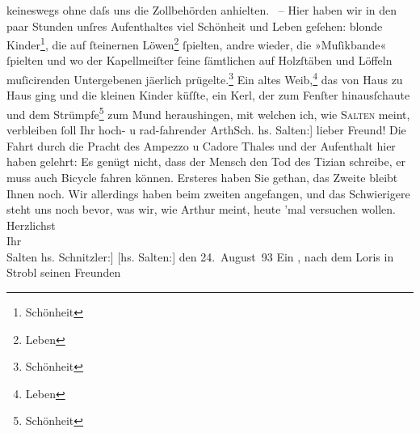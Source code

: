 \begin{ledgroupsized}[t]{13cm}
               keineswegs ohne daſs uns die Zollbehörden anhielten.  – Hier haben wir in den paar
               Stunden unſres Aufenthaltes viel Schönheit und Leben geſehen: blonde Kinder\footnote{\noindent{}Schönheit}, die auf ſteinernen Löwen\footnote{\noindent{}Leben}{ }ſpielten, andre wieder, die »Muſikbande« ſpielten
               und wo der Kapellmeiſter ſeine ſämtlichen auf {\pb}Holzſtäben
               und Löffeln muſicirenden Untergebenen jä{\geminationm}erlich
                  prügelte.\footnote{\noindent{}Schönheit} Ein altes Weib,\footnote{\noindent{}Leben} das von Haus zu Haus ging und die kleinen Kinder küſſte, ein Kerl, der
               zum Fenſter hinausſchaute und dem Strümpfe\footnote{\noindent{}Schönheit} zum Mund heraushingen, mit welchen ich, wie \textsc{Salten} meint, verbleiben ſoll\pend
           \pstart Ihr hoch- u rad-fahrender \spacefill\mbox{ArthSch.}\pend{}\pstart
           \noindent{}{\pb}{[}hs. Salten:{]} lieber Freund! Die Fahrt durch die Pracht des Ampezzo u Cadore Thales und
               der Aufenthalt hier haben gelehrt: Es genügt nicht, dass der Mensch den Tod des Tizian schreibe, er muss auch Bicycle fahren
               können. Ersteres haben Sie gethan, das Zweite bleibt Ihnen noch. Wir allerdings haben
               beim zweiten angefangen, und das Schwierigere steht uns noch bevor, was wir, wie
               Arthur meint, heute ’mal versuchen wollen.\pend
           \pstart
           Herzlichst{\\}Ihr{\\}\spacefill\mbox{Salten}\pend
           \pstart
           \noindent{}{[}hs. Schnitzler:{]} \label{T_L00259_1v}\label{T_L00259_1h}\pend
           \pstart
           {[}hs. Salten:{]} den 24. August 93\pend
           \pstart
           Ein \label{K_L00259_1v}\label{K_L00259_1h}, nach dem Loris in Strobl seinen Freunden

\end{ledgroupsized}
